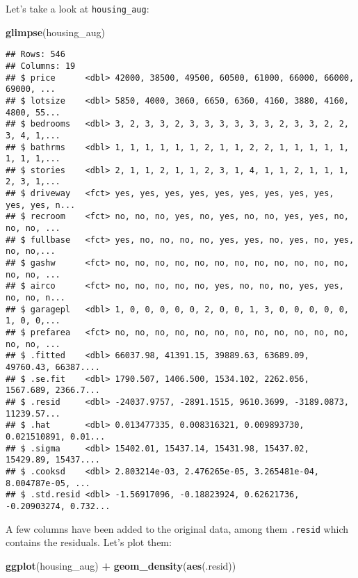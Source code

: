 \documentclass[
]{article}
\newenvironment{Shaded}{\begin{snugshade}}{\end{snugshade}}
\newcommand{\KeywordTok}[1]{\textcolor[rgb]{0.13,0.29,0.53}{\textbf{#1}}}
\newcommand{\NormalTok}[1]{#1}
\newcommand{\OperatorTok}[1]{\textcolor[rgb]{0.81,0.36,0.00}{\textbf{#1}}}
\newcommand{\StringTok}[1]{\textcolor[rgb]{0.31,0.60,0.02}{#1}}
\begin{document}
Let's take a look at \texttt{housing\_aug}:

\begin{Shaded}
\begin{Highlighting}[]
\KeywordTok{glimpse}\NormalTok{(housing\_aug)}
\end{Highlighting}
\end{Shaded}

\begin{verbatim}
## Rows: 546
## Columns: 19
## $ price      <dbl> 42000, 38500, 49500, 60500, 61000, 66000, 66000, 69000, ...
## $ lotsize    <dbl> 5850, 4000, 3060, 6650, 6360, 4160, 3880, 4160, 4800, 55...
## $ bedrooms   <dbl> 3, 2, 3, 3, 2, 3, 3, 3, 3, 3, 3, 2, 3, 3, 2, 2, 3, 4, 1,...
## $ bathrms    <dbl> 1, 1, 1, 1, 1, 1, 2, 1, 1, 2, 2, 1, 1, 1, 1, 1, 1, 1, 1,...
## $ stories    <dbl> 2, 1, 1, 2, 1, 1, 2, 3, 1, 4, 1, 1, 2, 1, 1, 1, 2, 3, 1,...
## $ driveway   <fct> yes, yes, yes, yes, yes, yes, yes, yes, yes, yes, yes, n...
## $ recroom    <fct> no, no, no, yes, no, yes, no, no, yes, yes, no, no, no, ...
## $ fullbase   <fct> yes, no, no, no, no, yes, yes, no, yes, no, yes, no, no,...
## $ gashw      <fct> no, no, no, no, no, no, no, no, no, no, no, no, no, no, ...
## $ airco      <fct> no, no, no, no, no, yes, no, no, no, yes, yes, no, no, n...
## $ garagepl   <dbl> 1, 0, 0, 0, 0, 0, 2, 0, 0, 1, 3, 0, 0, 0, 0, 0, 1, 0, 0,...
## $ prefarea   <fct> no, no, no, no, no, no, no, no, no, no, no, no, no, no, ...
## $ .fitted    <dbl> 66037.98, 41391.15, 39889.63, 63689.09, 49760.43, 66387....
## $ .se.fit    <dbl> 1790.507, 1406.500, 1534.102, 2262.056, 1567.689, 2366.7...
## $ .resid     <dbl> -24037.9757, -2891.1515, 9610.3699, -3189.0873, 11239.57...
## $ .hat       <dbl> 0.013477335, 0.008316321, 0.009893730, 0.021510891, 0.01...
## $ .sigma     <dbl> 15402.01, 15437.14, 15431.98, 15437.02, 15429.89, 15437....
## $ .cooksd    <dbl> 2.803214e-03, 2.476265e-05, 3.265481e-04, 8.004787e-05, ...
## $ .std.resid <dbl> -1.56917096, -0.18823924, 0.62621736, -0.20903274, 0.732...
\end{verbatim}

A few columns have been added to the original data, among them \texttt{.resid} which contains the
residuals. Let's plot them:

\begin{Shaded}
\begin{Highlighting}[]
\KeywordTok{ggplot}\NormalTok{(housing\_aug) }\OperatorTok{+}
\StringTok{  }\KeywordTok{geom\_density}\NormalTok{(}\KeywordTok{aes}\NormalTok{(.resid))}
\end{Highlighting}
\end{Shaded}
\end{document}
